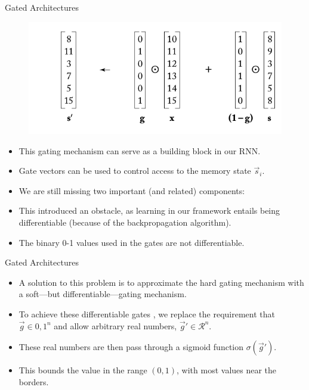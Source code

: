 \documentclass[handout]{beamer}
\begin{document}
\begin{frame}{Gated Architectures}
\begin{scriptsize}
  \begin{figure}[h]
        	\includegraphics[scale = 0.35]{pics/gatedEx.png}
        \end{figure}
\begin{itemize}
\item This gating mechanism can serve as a building block in our RNN.
\item Gate vectors can be used to control access to the memory state $\vec{s}_i$.
\item We are still missing two important (and related) components: 
\begin{enumerate}
\end{enumerate}
\item This introduced an obstacle, as learning in our framework entails being differentiable (because of the backpropagation algorithm).
\item The binary 0-1 values used in the gates are not differentiable.
\end{itemize}
\end{scriptsize}
\end{frame}


\begin{frame}{Gated Architectures}
\begin{scriptsize}

\begin{itemize}
\item A solution to this problem is to approximate the hard gating mechanism with a soft—but differentiable—gating mechanism.
\item To achieve these differentiable gates , we replace the requirement that $\vec{g} \in {0,1}^n$ and allow arbitrary real numbers, $\vec{g}' \in \mathcal{R}^n$.
\item These real numbers are then pass through a sigmoid function $\sigma(\vec{g}')$.
\item This bounds the value in the range $(0,1)$, with most values
near the borders.
\end{itemize}
\end{scriptsize}
\end{frame}
\end{document}
